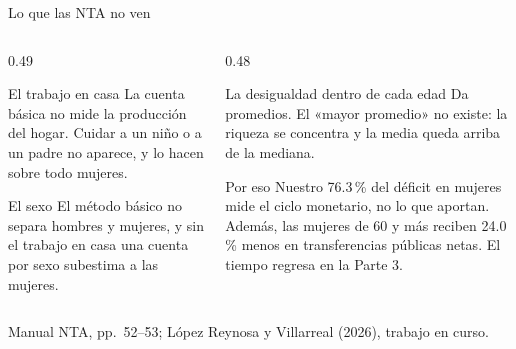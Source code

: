 \documentclass[aspectratio=169,11pt]{beamer}
\newcommand{\fuente}[1]{\par\vfill{\small\color{cGris}#1\par}}
\begin{document}
\begin{frame}{Lo que las NTA no ven}
  \begin{columns}[T]
    \begin{column}{0.49\textwidth}
      \begin{block}{El trabajo en casa}
        La cuenta básica no mide la producción del hogar. Cuidar a un niño o a un padre no aparece, y lo hacen sobre todo mujeres.
      \end{block}
      \begin{block}{El sexo}
        El método básico no separa hombres y mujeres, y sin el trabajo en casa una cuenta por sexo subestima a las mujeres.
      \end{block}
    \end{column}
    \begin{column}{0.48\textwidth}
      \begin{block}{La desigualdad dentro de cada edad}
        Da promedios. El «mayor promedio» no existe: la riqueza se concentra y la media queda arriba de la mediana.
      \end{block}
      \pause
      \begin{alertblock}{Por eso}
        Nuestro 76.3\,\% del déficit en mujeres mide el ciclo monetario, no lo que aportan. Además, las mujeres de 60 y más reciben 24.0\,\% menos en transferencias públicas netas. El tiempo regresa en la Parte 3.
      \end{alertblock}
    \end{column}
  \end{columns}
  \fuente{Manual NTA, pp.~52--53; López Reynosa y Villarreal (2026), trabajo en curso.}
\end{frame}
\end{document}
